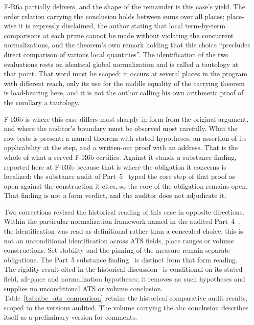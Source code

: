 \documentclass[11pt,a4paper]{article}
\begin{document}
F-R6a partially delivers, and the shape of the remainder is this case's yield.
The order relation carrying the conclusion holds between sums over all places;
place-wise it is expressly disclaimed, the author stating that local
term-by-term comparisons at each prime cannot be made without violating the
concurrent normalizations, and the theorem's own remark holding that this choice
``precludes direct comparison of various local quantities''. The identification
of the two evaluations rests on identical global normalization and is called a
tautology at that point. That word must be scoped: it occurs at several places in
the program with different reach, only its use for the middle equality of the
carrying theorem is load-bearing here, and it is not the author calling his own
arithmetic proof of the corollary a tautology.

F-R6b is where this case differs most sharply in form from the original
argument, and where the auditor's boundary must be observed most carefully. What
the row tests is present: a named theorem with stated hypotheses, an assertion of
its applicability at the step, and a written-out proof with an address. That is
the whole of what a served F-R6b certifies. Against it stands a substance
finding, reported here at F-R6b because that is where the obligation it concerns
is localized: the substance audit of Part~5~\cite{part5} typed the core step of
that proof as open against the construction it cites, so the core of the
obligation remains open. That finding is not a form verdict, and the auditor
does not adjudicate it.

Two corrections revised the historical reading of this case in opposite
directions. Within the particular normalization framework named in the
audited Part~4~\cite{part4}, the identification was read as definitional
rather than a concealed choice; this is not an unconditional identification
across ATS fields, place ranges or volume constructions. Set stability and
the pinning of the measure remain separate obligations. The Part~5 substance
finding~\cite{part5} is distinct from that form reading. The rigidity result
cited in the historical discussion~\cite{part6} is conditional on its stated
field, all-place and normalization hypotheses; it removes no such hypotheses
and supplies no unconditional ATS or volume conclusion.
Table~\ref{tab:abc_ats_comparison} retains the historical comparative audit
results, scoped to the versions audited. The volume carrying the abc
conclusion describes itself as a preliminary version for comments.
\end{document}
